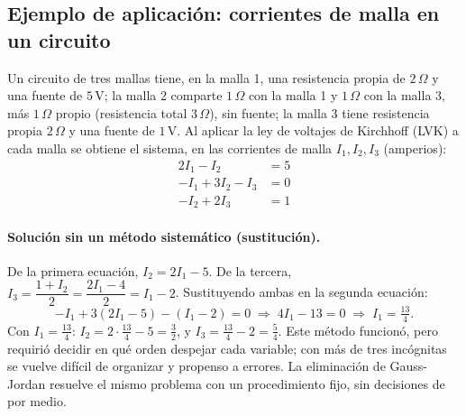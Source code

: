 \documentclass[11pt,letterpaper]{article}
\theoremstyle{definition}
\theoremstyle{plain}
\begin{document}
\subsection{Ejemplo de aplicación: corrientes de malla en un circuito}\label{sec:circuito}

Un circuito de tres mallas tiene, en la malla 1, una resistencia propia de $2\,\Omega$ y una
fuente de $5\,\text{V}$; la malla 2 comparte $1\,\Omega$ con la malla 1 y $1\,\Omega$ con la
malla 3, más $1\,\Omega$ propio (resistencia total $3\,\Omega$), sin fuente; la malla 3 tiene
resistencia propia $2\,\Omega$ y una fuente de $1\,\text{V}$. Al aplicar la ley de voltajes de
Kirchhoff (LVK) a cada malla se obtiene el sistema, en las corrientes de malla
$I_1,I_2,I_3$ (amperios):
\[
\begin{aligned}
  2I_1 - I_2 &= 5 \\
  -I_1 + 3I_2 - I_3 &= 0 \\
  -I_2 + 2I_3 &= 1
\end{aligned}
\]

\paragraph{Solución sin un método sistemático (sustitución).}
De la primera ecuación, $I_2 = 2I_1-5$. De la tercera, $I_3 = \dfrac{1+I_2}{2} =
\dfrac{2I_1-4}{2} = I_1-2$. Sustituyendo ambas en la segunda ecuación:
\[
  -I_1 + 3(2I_1-5) - (I_1-2) = 0 \;\Longrightarrow\; 4I_1 - 13 = 0 \;\Longrightarrow\; I_1 = \tfrac{13}{4}.
\]
Con $I_1=\tfrac{13}{4}$: $I_2 = 2\cdot\tfrac{13}{4}-5 = \tfrac{3}{2}$, y
$I_3 = \tfrac{13}{4}-2 = \tfrac{5}{4}$. Este método funcionó, pero requirió decidir en qué orden
despejar cada variable; con más de tres incógnitas se vuelve difícil de organizar y propenso a
errores. La eliminación de Gauss-Jordan resuelve el mismo problema con un procedimiento fijo,
sin decisiones de por medio.
\end{document}
